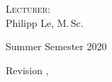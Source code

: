 \begin{titlepage}
\begin{center}
		\vspace{0.75cm}

		\normalsize
		\textsc{Lecturer:} \\
		Philipp Le, M.\,Sc.
		
		\vspace{0.75cm}
		
		\normalsize
		Summer Semester 2020
	\end{center}

	\vfill
	
	\begin{flushright}
		\footnotesize
		Revision \therevision, \therevisiondate
	\end{flushright}
\end{titlepage}
